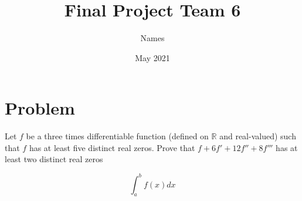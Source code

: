 \documentclass{article}
\title{Final Project Team 6}
\author{Names}
\date{May 2021}
\begin{document}
    \maketitle

    \section*{Problem}
    Let $f$ be a three times differentiable function (defined on $\mathbb{R}$
    and real-valued) such that $f$ has at least five distinct real zeros. 
    Prove that $f + 6f' + 12f'' + 8f'''$ has at least two distinct real zeros

    $$ 
    \int_a^bf(x)dx
    $$
\end{document}
